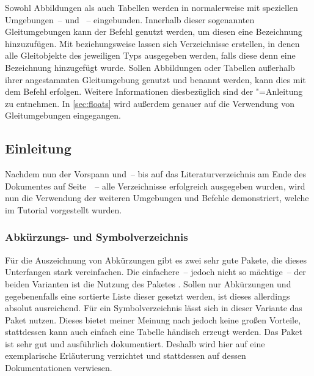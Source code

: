 \documentclass[%
  english,ngerman,%
  geometry=no,DIV=12,automark,%
]{tudscrartcl}
\begin{document}
Sowohl Abbildungen als auch Tabellen werden in  normalerweise 
mit speziellen Umgebungen~--  und ~-- 
eingebunden. Innerhalb dieser sogenannten Gleitumgebungen kann der Befehl 
 genutzt 
werden, um diesen eine Bezeichnung hinzuzufügen. Mit  
beziehungsweise  lassen sich Verzeichnisse erstellen, in 
denen alle Gleitobjekte des jeweiligen Typs ausgegeben werden, falls diese denn 
eine Bezeichnung hinzugefügt wurde. Sollen Abbildungen oder Tabellen außerhalb 
ihrer angestammten Gleitumgebung genutzt und benannt werden, kann dies mit dem 
Befehl 
 erfolgen. Weitere Informationen diesbezüglich sind der 
\KOMAScript"=Anleitung \scrguide zu entnehmen. In \autoref{sec:floats} wird 
außerdem genauer auf die Verwendung von Gleitumgebungen eingegangen.
%
\begin{Trunk}
\tableofcontents
\listoffigures
\listoftables

\end{Trunk}
\begin{Trunk+}
\printacronyms[style=acrotabu]
\printsymbols[style=symblongtabu]

\chapter{Einleitung}
Nachdem nun der Vorspann und~-- bis auf das Literaturverzeichnis am 
Ende des Dokumentes auf Seite~\pageref{sec:bibliography}~-- alle 
Verzeichnisse erfolgreich ausgegeben wurden, wird nun die Verwendung 
der weiteren Umgebungen und Befehle demonstriert, welche im Tutorial 
 vorgestellt wurden.

\end{Trunk+}


\subsection{Abkürzungs- und Symbolverzeichnis}
\label{sec:glossaries}
Für die Auszeichnung von Abkürzungen gibt es zwei sehr gute Pakete, die dieses 
Unterfangen stark vereinfachen. Die einfachere~-- jedoch nicht so mächtige~-- 
der beiden Varianten ist die Nutzung des Paketes . Sollen nur 
Abkürzungen und gegebenenfalls eine sortierte Liste dieser gesetzt werden, ist 
dieses allerdings absolut ausreichend. Für ein Symbolverzeichnis lässt sich in 
dieser Variante das Paket  nutzen. Dieses bietet meiner 
Meinung nach jedoch keine großen Vorteile, stattdessen kann auch einfach eine 
Tabelle händisch erzeugt werden. Das Paket  ist sehr gut und 
ausführlich dokumentiert. Deshalb wird hier auf eine exemplarische Erläuterung 
verzichtet und stattdessen auf dessen Dokumentationen verwiesen.
\end{document}
